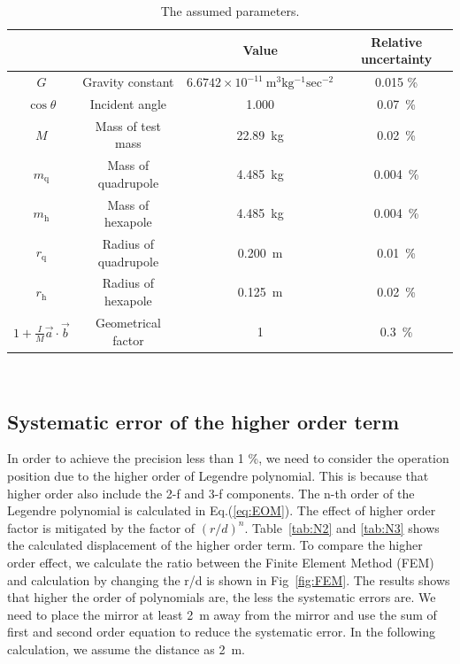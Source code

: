 \documentclass[A4]{spie}  %
\begin{document}
\begin{table}
\begin{center}
\caption{\label{sus}The assumed parameters.}
\footnotesize
\begin{tabular}{cccc}
\hline
&&Value&Relative uncertainty \\
\hline
$G$& Gravity constant&$6.6742 \times 10^{-11}~\mathrm{m^3kg^{-1}sec^{-2}}$&0.015 \%\\
$\cos{\theta}$& Incident angle&1.000& 0.07~\%\\
$M$& Mass of test mass&22.89~kg & 0.02~\%\\
$m_{\mathrm{q}}$&Mass of quadrupole&4.485~kg & 0.004~\%\\
$m_{\mathrm{h}}$&Mass of hexapole& 4.485~kg &0.004~\%\\
$r_{\mathrm{q}}$&Radius of quadrupole&0.200~m & 0.01~\%\\
$r_{\mathrm{h}}$&Radius of hexapole& 0.125~m & 0.02~\%\\
$1+\frac{I}{M}\vec{a}\cdot \vec{b}$& Geometrical factor & 1&0.3~\% \\
\hline
\end{tabular}\\
\end{center}
\end{table}

\subsection{Systematic error of the higher order term}
In order to achieve the precision less than 1 \%, we need to consider the operation position due to the higher order of Legendre polynomial. This is because that higher order also include the 2-f and 3-f components. The n-th order of the Legendre polynomial is calculated in Eq.(\ref{eq:EOM}). The effect of higher order factor is mitigated by the factor of $(r/d)^n$. Table~\ref{tab:N2} and \ref{tab:N3} shows the calculated displacement of the higher order term. To compare the higher order effect, we calculate the ratio between the Finite Element Method (FEM) and calculation by changing the r/d is shown in Fig~\ref{fig:FEM}. The results shows that higher the order of polynomials are, the less the systematic errors are. We need to place the mirror at least 2~m away from the mirror and use the sum of first and second order equation to reduce the systematic error. In the following calculation, we assume the distance as 2~m. 
\end{document}
